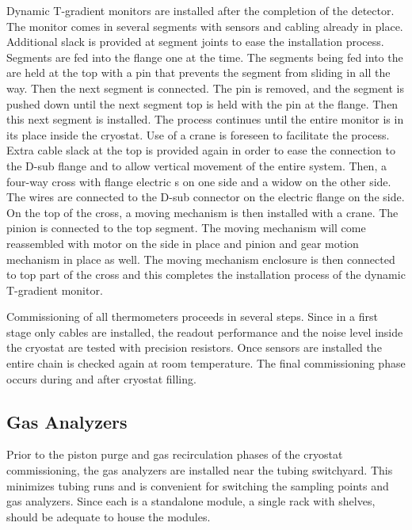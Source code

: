 Dynamic T-gradient monitors are installed after the completion of the detector.
The monitor comes in several segments with sensors and cabling already
in place. Additional slack is provided at segment joints to ease the
installation process. Segments are fed into the flange one at the
time. The segments being fed into the  are held at the top
with a pin that prevents the segment from sliding in all the way. Then the next
segment is connected. The pin is removed, and the
segment is pushed down until the next segment top is held with the
pin at the flange. Then this next segment is installed. The
process  continues until the entire monitor is in its place
inside the cryostat. Use of a crane is foreseen to facilitate the process.
Extra cable slack at the top is provided again in order to ease  the
connection to the D-sub flange and to allow  vertical movement of the
entire system. Then,  a four-way cross with flange electric \fdth{}s on
one side and a widow on the other side. 
The wires are connected to
the D-sub connector on the electric flange \fdth on the side. On the
top of the cross, a moving mechanism is then installed with a crane.
The pinion is connected to the top segment. The moving mechanism will
come reassembled with motor on the side in place and pinion and gear
motion mechanism in place as well. The moving mechanism enclosure  is then connected to top part of the cross and this completes the
installation process of the dynamic T-gradient monitor.

Commissioning of all thermometers proceeds in several steps. Since in a first stage only cables are installed,
the readout performance and the noise level inside the cryostat are
tested with precision resistors. Once sensors are installed the entire chain is checked again at room temperature.
The final commissioning phase occurs during and after cryostat filling.  


\subsection{Gas Analyzers}
\label{sec:fdgen-slow-cryo-install-ga}
 
Prior to the piston purge and gas recirculation phases of the cryostat commissioning, the gas analyzers are installed near the %
tubing switchyard. This minimizes tubing runs and is  convenient for switching the sampling points and gas analyzers. Since each is a standalone module, a single rack with shelves, should be adequate to house the modules.

